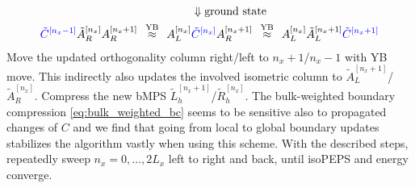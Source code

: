 \begin{enumerate}
\begin{align}
\begin{split}
	&\Downarrow \text{ground state} \\
	\textcolor{blue}{\tilde{C}^{[n_x-1]}} \tilde{A}_R^{[n_x]} A_R^{[n_x+1]} 
	\:\: \overset{\text{YB}}{\approx} \:\:
	A_L^{[n_x]} &\textcolor{blue}{\tilde{C}^{[n_x]}} A_R^{[n_x+1]} 
	\:\: \overset{\text{YB}}{\approx } \:\:
	A_L^{[n_x]} \tilde{A}_L^{[n_x+1]} \textcolor{blue}{\tilde{C}^{[n_x+1]}}
\end{split}
\end{align}
Move the updated orthogonality column right/left to $n_x+1$/$n_x-1$ with YB move. This indirectly also updates the involved isometric column to $\tilde{A}_L^{[n_x+1]}$/$\tilde{A}_R^{[n_x]}$. Compress the new bMPS $\tilde{L}_h^{[n_x+1]}$/$\tilde{R}_h^{[n_x]}$. The bulk-weighted boundary compression \eqref{eq:bulk_weighted_bc} seems to be sensitive also to propagated changes of $C$ and we find that going from local to global boundary updates stabilizes the algorithm vastly when using this scheme. With the described steps, repeatedly sweep $n_x = 0, \ldots, 2L_x$ left to right and back, until isoPEPS and energy converge. 


\end{enumerate}
